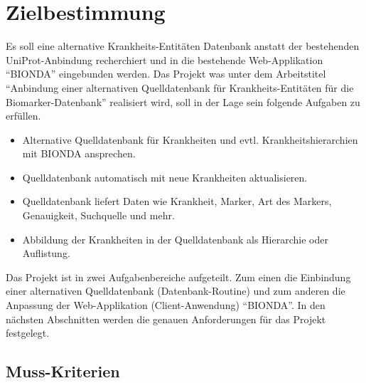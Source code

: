 \chapter*{Zielbestimmung}
Es soll eine alternative Krankheits-Entitäten Datenbank anstatt der bestehenden UniProt-Anbindung recherchiert und in die bestehende Web-Applikation \enquote{BIONDA} eingebunden werden. Das Projekt was unter dem Arbeitstitel \enquote{Anbindung einer alternativen Quelldatenbank für Krankheits-Entitäten für die Biomarker-Datenbank} realisiert wird, soll in der Lage sein folgende Aufgaben zu erfüllen.

\begin{itemize}
\item{Alternative Quelldatenbank für Krankheiten und evtl. Krankheitshierarchien mit BIONDA ansprechen.}
\item{Quelldatenbank automatisch mit neue Krankheiten aktualisieren.}
\item{Quelldatenbank liefert Daten wie Krankheit, Marker, Art des Markers, Genauigkeit, Suchquelle und mehr.}
\item{Abbildung der Krankheiten in der Quelldatenbank als Hierarchie oder Auflistung.}
\end{itemize}

Das Projekt ist in zwei Aufgabenbereiche aufgeteilt. Zum einen die Einbindung einer alternativen Quelldatenbank (Datenbank-Routine) und zum anderen die Anpassung der Web-Applikation (Client-Anwendung) \enquote{BIONDA}. In den nächsten Abschnitten werden die genauen Anforderungen für das Projekt festgelegt.

\section*{Muss-Kriterien}


